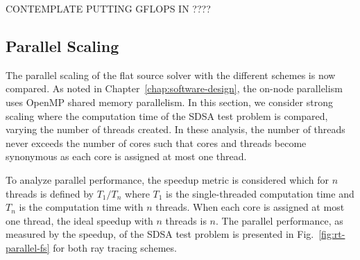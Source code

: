 CONTEMPLATE PUTTING GFLOPS IN ????

\subsection{Parallel Scaling}

The parallel scaling of the flat source solver with the different schemes is now compared. As noted in Chapter~\ref{chap:software-design}, the on-node parallelism uses OpenMP shared memory parallelism. In this section, we consider strong scaling where the computation time of the SDSA test problem is compared, varying the number of threads created. In these analysis, the number of threads never exceeds the number of cores such that cores and threads become synonymous as each core is assigned at most one thread. 

To analyze parallel performance, the speedup metric is considered which for $n$ threads is defined by $T_1 / T_n$ where $T_1$ is the single-threaded computation time and $T_n$ is the computation time with $n$ threads. When each core is assigned at most one thread, the ideal speedup with $n$ threads is $n$. The parallel performance, as measured by the speedup, of the SDSA test problem is presented in Fig.~\ref{fig:rt-parallel-fs} for both ray tracing schemes.

